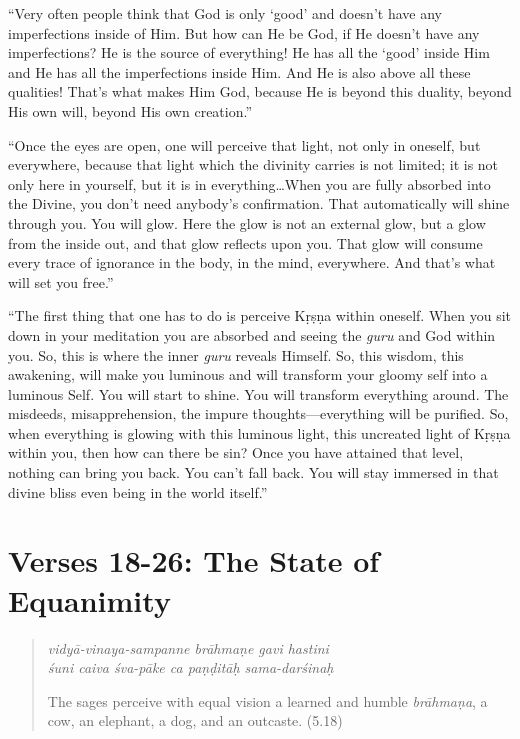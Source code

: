 \documentclass[12pt, twoside, openright]{memoir}
\begin{document}
\enquote{Very often people think that God is only \enquote{good} and doesn’t have any imperfections inside of Him. But how can He be God, if He doesn’t have any imperfections? He is the source of everything! He has all the \enquote{good} inside Him and He has all the imperfections inside Him. And He is also above all these qualities! That’s what makes Him God, because He is beyond this duality, beyond His own will, beyond His own creation.}

\enquote{Once the eyes are open, one will perceive that light, not only in oneself, but everywhere, because that light which the divinity carries is not limited; it is not only here in yourself, but it is in everything\ldots When you are fully absorbed into the Divine, you don’t need anybody’s confirmation. That automatically will shine through you. You will glow. Here the glow is not an external glow, but a glow from the inside out, and that glow reflects upon you. That glow will consume every trace of ignorance in the body, in the mind, everywhere. And that’s what will set you free.}

\enquote{The first thing that one has to do is perceive Kṛṣṇa within oneself. When you sit down in your meditation you are absorbed and seeing the \textit{guru} and God within you. So, this is where the inner \textit{guru} reveals Himself. So, this wisdom, this awakening, will make you luminous and will transform your gloomy self into a luminous Self. You will start to shine. You will transform everything around. The misdeeds, misapprehension, the impure thoughts---everything will be purified. So, when everything is glowing with this luminous light, this uncreated light of Kṛṣṇa within you, then how can there be sin? Once you have attained that level, nothing can bring you back. You can’t fall back. You will stay immersed in that divine bliss even being in the world itself.}

\section{Verses 18-26: The State of Equanimity}\label{sec-verses-18-26-the-state-of-equanimity}


\par
\begin{verse}
\textit{vidyā-vinaya-sampanne brāhmaṇe gavi hastini} \\
\textit{śuni caiva śva-pāke ca paṇḍitāḥ sama-darśinaḥ}

\noindent The sages perceive with equal vision a learned and humble \textit{brāhmaṇa}, a cow, an elephant, a dog, and an outcaste. (5.18)
\end{verse}
\par
\end{document}
